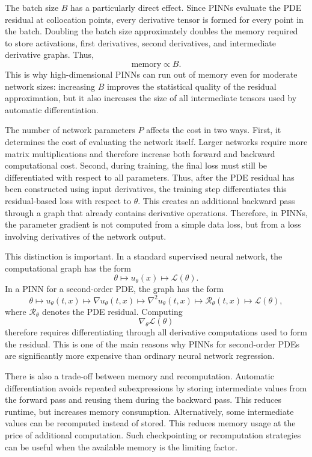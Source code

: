 The batch size $B$ has a particularly direct effect. Since PINNs evaluate the PDE residual at collocation points, every derivative tensor is formed for every point in the batch. Doubling the batch size approximately doubles the memory required to store activations, first derivatives, second derivatives, and intermediate derivative graphs. Thus,
\[
    \mathrm{memory}
    \propto B.
\]
This is why high-dimensional PINNs can run out of memory even for moderate network sizes: increasing $B$ improves the statistical quality of the residual approximation, but it also increases the size of all intermediate tensors used by automatic differentiation.

The number of network parameters $P$ affects the cost in two ways. First, it determines the cost of evaluating the network itself. Larger networks require more matrix multiplications and therefore increase both forward and backward computational cost. Second, during training, the final loss must still be differentiated with respect to all parameters. Thus, after the PDE residual has been constructed using input derivatives, the training step differentiates this residual-based loss with respect to $\theta$. This creates an additional backward pass through a graph that already contains derivative operations. Therefore, in PINNs, the parameter gradient is not computed from a simple data loss, but from a loss involving derivatives of the network output.

This distinction is important. In a standard supervised neural network, the computational graph has the form
\[
    \theta \longmapsto u_\theta(x) \longmapsto \mathcal{L}(\theta).
\]
In a PINN for a second-order PDE, the graph has the form
\[
    \theta
    \longmapsto
    u_\theta(t,x)
    \longmapsto
    \nabla u_\theta(t,x)
    \longmapsto
    \nabla^2 u_\theta(t,x)
    \longmapsto
    \mathcal{R}_\theta(t,x)
    \longmapsto
    \mathcal{L}(\theta),
\]
where $\mathcal{R}_\theta$ denotes the PDE residual. Computing
\[
    \nabla_\theta \mathcal{L}(\theta)
\]
therefore requires differentiating through all derivative computations used to form the residual. This is one of the main reasons why PINNs for second-order PDEs are significantly more expensive than ordinary neural network regression.

There is also a trade-off between memory and recomputation. Automatic differentiation avoids repeated subexpressions by storing intermediate values from the forward pass and reusing them during the backward pass. This reduces runtime, but increases memory consumption. Alternatively, some intermediate values can be recomputed instead of stored. This reduces memory usage at the price of additional computation. Such checkpointing or recomputation strategies can be useful when the available memory is the limiting factor.

